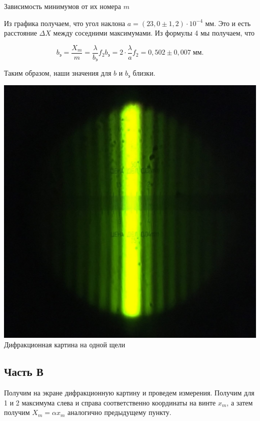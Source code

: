 \documentclass[a4paper, 12pt]{article}%
\begin{document}
\begin{center}
Зависимость минимумов от их номера $ m $
\end{center}

Из графика получаем, что угол наклона $ a = (23,0 \pm 1,2) \cdot 10^{-4} $ мм. Это и есть расстояние $ \Delta X $ между соседними максимумами. Из формулы 4 мы получаем, что

\begin{equation}
b_{\text{э}}= \frac{X_m}{m} = \dfrac{\lambda}{b_{\text{э}}} f_2 b_{\text{э}} = 2 \cdot \dfrac{\lambda}{a} f_2 = 0,502 \pm 0,007 \; мм.
\end{equation}

Таким образом, наши значения для $ b $ и $ b_{\text{э}} $ близки.
\
  \begin{center}
    \includegraphics[scale = 0.2]{pics/7.png}\\

    Дифракционная картина на одной щели
  \end{center}


\subsection{Часть В}

Получим на экране дифракционную картину и проведем измерения. Получим для 1 и 2 максимума слева и справа соответственно координаты на винте $ x_m $, а затем получим $ X_m = \alpha x_m $ аналогично предыдущему пункту.
\end{document}
